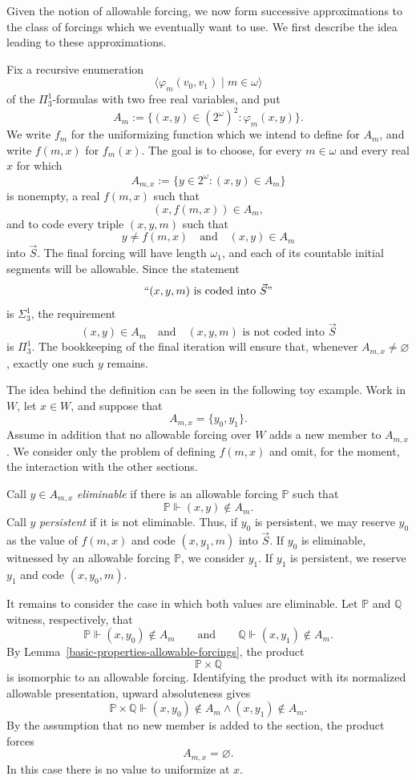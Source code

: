 \documentclass[a4paper,11pt]{article}
\newcommand{\forceP}{\mathbb{P}}
\newcommand{\forceQ}{\mathbb{Q}}
\begin{document}
Given the notion of allowable forcing, we now form successive approximations to the class of forcings which we eventually want to use.  We first describe the idea leading to these approximations.

Fix a recursive enumeration
\[
   \langle \varphi_m(v_0,v_1)\mid m\in\omega\rangle
\]
of the $\Pi^1_3$-formulas with two free real variables, and put
\[
   A_m:=\{(x,y)\in(2^\omega)^2:\varphi_m(x,y)\}.
\]
We write $f_m$ for the uniformizing function which we intend to define for $A_m$, and write $f(m,x)$ for $f_m(x)$.  The goal is to choose, for every $m\in\omega$ and every real $x$ for which
\[
   A_{m,x}:=\{y\in2^\omega:(x,y)\in A_m\}
\]
is nonempty, a real $f(m,x)$ such that
\[
   (x,f(m,x))\in A_m,
\]
and to code every triple $(x,y,m)$ such that
\[
   y\neq f(m,x)\quad\text{and}\quad(x,y)\in A_m
\]
into $\vec S$.  The final forcing will have length $\omega_1$, and each of its countable initial segments will be allowable.  Since the statement
\[
   ``(x,y,m)\text{ is coded into }\vec S"
\]
is $\Sigma^1_3$, the requirement
\[
   (x,y)\in A_m
   \quad\text{and}\quad
   (x,y,m)\text{ is not coded into }\vec S
\]
is $\Pi^1_3$.  The bookkeeping of the final iteration will ensure that, whenever $A_{m,x}\neq\varnothing$, exactly one such $y$ remains.

The idea behind the definition can be seen in the following toy example.  Work in $W$, let $x\in W$, and suppose that
\[
   A_{m,x}=\{y_0,y_1\}.
\]
Assume in addition that no allowable forcing over $W$ adds a new member to $A_{m,x}$.  We consider only the problem of defining $f(m,x)$ and omit, for the moment, the interaction with the other sections.

Call $y\in A_{m,x}$ \emph{eliminable} if there is an allowable forcing $\forceP$ such that
\[
   \forceP\Vdash (x,y)\notin A_m.
\]
Call $y$ \emph{persistent} if it is not eliminable.  Thus, if $y_0$ is persistent, we may reserve $y_0$ as the value of $f(m,x)$ and code $(x,y_1,m)$ into $\vec S$.  If $y_0$ is eliminable, witnessed by an allowable forcing $\forceP$, we consider $y_1$.  If $y_1$ is persistent, we reserve $y_1$ and code $(x,y_0,m)$.

It remains to consider the case in which both values are eliminable.  Let $\forceP$ and $\forceQ$ witness, respectively, that
\[
   \forceP\Vdash (x,y_0)\notin A_m
   \qquad\text{and}\qquad
   \forceQ\Vdash (x,y_1)\notin A_m.
\]
By Lemma~\ref{basic-properties-allowable-forcings}, the product
\[
   \forceP\times\forceQ
\]
is isomorphic to an allowable forcing.  Identifying the product with its
normalized allowable presentation, upward absoluteness gives
\[
   \forceP\times\forceQ\Vdash
   (x,y_0)\notin A_m\wedge(x,y_1)\notin A_m.
\]
By the assumption that no new member is added to the section, the product forces
\[
   A_{m,x}=\varnothing.
\]
In this case there is no value to uniformize at $x$.
\end{document}
